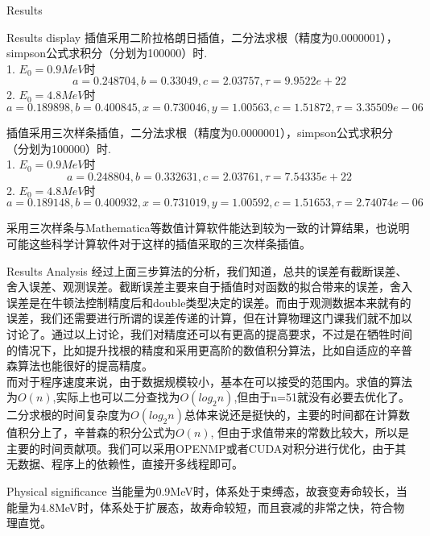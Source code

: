 \documentclass[letterpaper,12pt]{article}
\begin{document}
 \begin{section}{Results}
 \begin{subsection}{Results display}
 	插值采用二阶拉格朗日插值，二分法求根（精度为0.0000001），simpson公式求积分（分划为100000）时.\\
 	1. $E_0=0.9 MeV$时\\
 	 $$a=0.248704,b=0.33049,c=2.03757,\tau=9.9522e+22$$
 	2. $E_0=4.8 MeV$时\\
 	$$a=0.189898,b=0.400845,x=0.730046,y=1.00563,c=1.51872,\tau=3.35509e-06$$

 	插值采用三次样条插值，二分法求根（精度为0.0000001），simpson公式求积分（分划为100000）时.\\
 	1. $E_0=0.9 MeV$时\\
 	 $$a=0.248804,b=0.332631,c=2.03761,\tau=7.54335e+22$$
 	2. $E_0=4.8 MeV$时\\
 	$$a=0.189148,b=0.400932,x=0.731019,y=1.00592,c=1.51653,\tau=2.74074e-06$$

 	采用三次样条与Mathematica等数值计算软件能达到较为一致的计算结果，也说明可能这些科学计算软件对于这样的插值采取的三次样条插值。
 \end{subsection}
 \begin{subsection}{Results Analysis}
 	经过上面三步算法的分析，我们知道，总共的误差有截断误差、舍入误差、观测误差。截断误差主要来自于插值时对函数的拟合带来的误差，舍入误差是在牛顿法控制精度后和double类型决定的误差。而由于观测数据本来就有的误差，我们还需要进行所谓的误差传递的计算，但在计算物理这门课我们就不加以讨论了。通过以上讨论，我们对精度还可以有更高的提高要求，不过是在牺牲时间的情况下，比如提升找根的精度和采用更高阶的数值积分算法，比如自适应的辛普森算法也能很好的提高精度。\\

 	而对于程序速度来说，由于数据规模较小，基本在可以接受的范围内。求值的算法为$O(n)$,实际上也可以二分查找为$O(log_2n)$,但由于n=51就没有必要去优化了。二分求根的时间复杂度为$O(log_2n)$总体来说还是挺快的，主要的时间都在计算数值积分上了，辛普森的积分公式为$O(n)$, 但由于求值带来的常数比较大，所以是主要的时间贡献项。我们可以采用OPENMP或者CUDA对积分进行优化，由于其无数据、程序上的依赖性，直接开多线程即可。
 \end{subsection}

 \begin{subsection}{Physical significance}
 	当能量为0.9MeV时，体系处于束缚态，故衰变寿命较长，当能量为4.8MeV时，体系处于扩展态，故寿命较短，而且衰减的非常之快，符合物理直觉。
 \end{subsection}
 \end{section}
\end{document}
